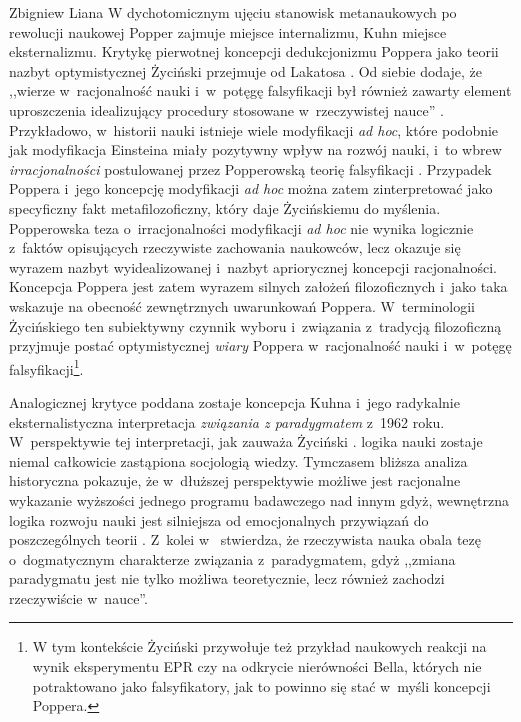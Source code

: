 \begin{artplenv}{Zbigniew Liana}
W dychotomicznym ujęciu stanowisk metanaukowych po rewolucji naukowej Popper zajmuje miejsce internalizmu, Kuhn miejsce
eksternalizmu. Krytykę pierwotnej koncepcji dedukcjonizmu Poppera jako teorii nazbyt optymistycznej Życiński przejmuje
od Lakatosa
\parencite[zob.][s.~120n]{zycinski_jezyk_1983}.
Od siebie dodaje, że  ,,wierze w~racjonalność
nauki i~w~potęgę falsyfikacji był również zawarty element uproszczenia idealizujący procedury stosowane w~rzeczywistej
nauce'' 
\parencite[s.~230]{zycinski_elementy_1996}.
Przykładowo, w~historii nauki istnieje wiele modyfikacji
\textit{ad hoc}, które podobnie jak modyfikacja Einsteina miały pozytywny wpływ na rozwój nauki, i~to wbrew
\textit{irracjonalności} postulowanej przez Popperowską teorię falsyfikacji
\parencite[zob.][s.~108]{zycinski_elementy_1996}.
Przypadek Poppera i~jego koncepcję modyfikacji \textit{ad hoc} można zatem zinterpretować jako specyficzny
fakt metafilozoficzny, który daje Życińskiemu do myślenia. Popperowska teza o~irracjonalności modyfikacji \textit{ad hoc}
nie wynika logicznie z~faktów opisujących rzeczywiste zachowania naukowców, lecz okazuje się wyrazem nazbyt
wyidealizowanej i~nazbyt apriorycznej koncepcji racjonalności. Koncepcja Poppera jest zatem wyrazem silnych założeń
filozoficznych i~jako taka wskazuje na obecność zewnętrznych uwarunkowań Poppera. W~terminologii Życińskiego ten
subiektywny czynnik wyboru i~związania z~tradycją filozoficzną przyjmuje postać optymistycznej \textit{wiary}
Poppera w~racjonalność nauki i~w~potęgę falsyfikacji\footnote{W tym kontekście Życiński przywołuje też przykład naukowych reakcji
na wynik eksperymentu EPR czy na  odkrycie nierówności Bella, których nie potraktowano jako falsyfikatory, jak to
powinno się stać w~myśli koncepcji Poppera.}.

Analogicznej krytyce poddana zostaje koncepcja Kuhna i~jego radykalnie eksternalistyczna interpretacja
\textit{związania z	paradygmatem} z~1962 roku. W~perspektywie tej interpretacji, jak zauważa Życiński 
\parencite*[s.~106]{zycinski_jezyk_1983}.
logika nauki zostaje niemal całkowicie zastąpiona socjologią wiedzy. Tymczasem bliższa analiza
historyczna pokazuje, że w~dłuższej perspektywie możliwe jest racjonalne wykazanie wyższości jednego programu
badawczego nad innym gdyż, wewnętrzna logika rozwoju nauki jest silniejsza od emocjonalnych przywiązań do
poszczególnych teorii
\parencite*[s.~165]{zycinski_jezyk_1983}.
Z~kolei w~\parencite*[s.~195]{zycinski_elementy_1996}
stwierdza, że
rzeczywista nauka obala tezę o~dogmatycznym charakterze związania z~paradygmatem, gdyż ,,zmiana paradygmatu jest nie
tylko możliwa teoretycznie, lecz również zachodzi rzeczywiście w~nauce''.


\end{artplenv}
